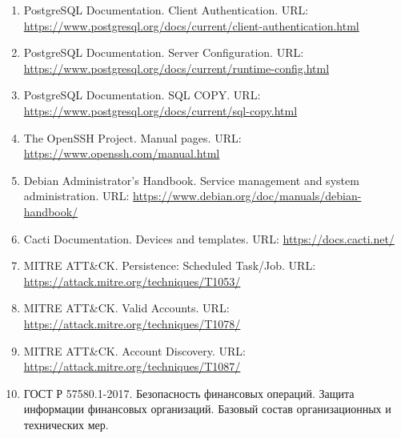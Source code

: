 \documentclass[14pt]{extarticle}
\begin{document}
\begin{enumerate}
  \item PostgreSQL Documentation. Client Authentication. URL: \url{https://www.postgresql.org/docs/current/client-authentication.html}
  \item PostgreSQL Documentation. Server Configuration. URL: \url{https://www.postgresql.org/docs/current/runtime-config.html}
  \item PostgreSQL Documentation. SQL COPY. URL: \url{https://www.postgresql.org/docs/current/sql-copy.html}
  \item The OpenSSH Project. Manual pages. URL: \url{https://www.openssh.com/manual.html}
  \item Debian Administrator's Handbook. Service management and system administration. URL: \url{https://www.debian.org/doc/manuals/debian-handbook/}
  \item Cacti Documentation. Devices and templates. URL: \url{https://docs.cacti.net/}
  \item MITRE ATT\&CK. Persistence: Scheduled Task/Job. URL: \url{https://attack.mitre.org/techniques/T1053/}
  \item MITRE ATT\&CK. Valid Accounts. URL: \url{https://attack.mitre.org/techniques/T1078/}
  \item MITRE ATT\&CK. Account Discovery. URL: \url{https://attack.mitre.org/techniques/T1087/}
  \item ГОСТ Р 57580.1-2017. Безопасность финансовых операций. Защита информации финансовых организаций. Базовый состав организационных и технических мер.
\end{enumerate}
\end{document}
